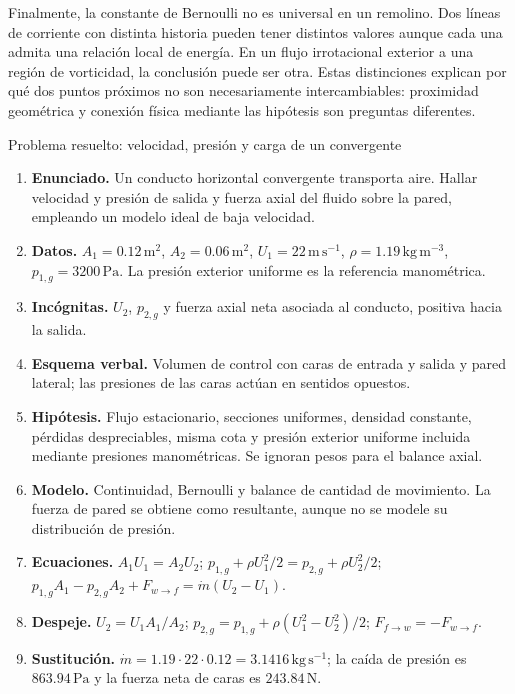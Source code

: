 Finalmente, la constante de Bernoulli no es universal en un remolino. Dos líneas de corriente con distinta historia pueden tener distintos valores aunque cada una admita una relación local de energía. En un flujo irrotacional exterior a una región de vorticidad, la conclusión puede ser otra. Estas distinciones explican por qué dos puntos próximos no son necesariamente intercambiables: proximidad geométrica y conexión física mediante las hipótesis son preguntas diferentes.

\begin{studiumworked}{Problema resuelto: velocidad, presión y carga de un convergente}

\begin{enumerate}
\item \textbf{Enunciado.} Un conducto horizontal convergente transporta aire. Hallar velocidad y presión de salida y fuerza axial del fluido sobre la pared, empleando un modelo ideal de baja velocidad.
\item \textbf{Datos.} $A_1=0.12\,\mathrm{m^2}$, $A_2=0.06\,\mathrm{m^2}$, $U_1=22\,\mathrm{m\,s^{-1}}$, $\rho=1.19\,\mathrm{kg\,m^{-3}}$, $p_{1,g}=3200\,\mathrm{Pa}$. La presión exterior uniforme es la referencia manométrica.
\item \textbf{Incógnitas.} $U_2$, $p_{2,g}$ y fuerza axial neta asociada al conducto, positiva hacia la salida.
\item \textbf{Esquema verbal.} Volumen de control con caras de entrada y salida y pared lateral; las presiones de las caras actúan en sentidos opuestos.
\item \textbf{Hipótesis.} Flujo estacionario, secciones uniformes, densidad constante, pérdidas despreciables, misma cota y presión exterior uniforme incluida mediante presiones manométricas. Se ignoran pesos para el balance axial.
\item \textbf{Modelo.} Continuidad, Bernoulli y balance de cantidad de movimiento. La fuerza de pared se obtiene como resultante, aunque no se modele su distribución de presión.
\item \textbf{Ecuaciones.} $A_1U_1=A_2U_2$; $p_{1,g}+\rho U_1^2/2=p_{2,g}+\rho U_2^2/2$; $p_{1,g}A_1-p_{2,g}A_2+F_{w\to f}=\dot m(U_2-U_1)$.
\item \textbf{Despeje.} $U_2=U_1A_1/A_2$; $p_{2,g}=p_{1,g}+\rho(U_1^2-U_2^2)/2$; $F_{f\to w}=-F_{w\to f}$.
\item \textbf{Sustitución.} $\dot m=1.19\cdot22\cdot0.12=3.1416\,\mathrm{kg\,s^{-1}}$; la caída de presión es $863.94\,\mathrm{Pa}$ y la fuerza neta de caras es $243.84\,\mathrm{N}$.

\end{enumerate}
\end{studiumworked}
